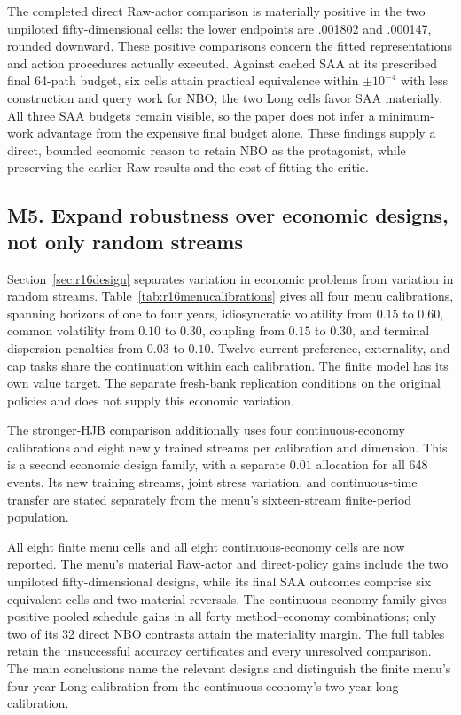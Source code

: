 The completed direct Raw-actor comparison is materially positive in the two unpiloted fifty-dimensional cells: the lower endpoints are .001802 and .000147, rounded downward. These positive comparisons concern the fitted representations and action procedures actually executed. Against cached SAA at its prescribed final 64-path budget, six cells attain practical equivalence within $\pm10^{-4}$ with less construction and query work for NBO; the two Long cells favor SAA materially. All three SAA budgets remain visible, so the paper does not infer a minimum-work advantage from the expensive final budget alone. These findings supply a direct, bounded economic reason to retain NBO as the protagonist, while preserving the earlier Raw results and the cost of fitting the critic.

\subsection*{M5. Expand robustness over economic designs, not only random streams}\label{resp:M5}
Section~\ref{sec:r16design} separates variation in economic problems from variation in random streams. Table~\ref{tab:r16menucalibrations} gives all four menu calibrations, spanning horizons of one to four years, idiosyncratic volatility from $0.15$ to $0.60$, common volatility from $0.10$ to $0.30$, coupling from $0.15$ to $0.30$, and terminal dispersion penalties from $0.03$ to $0.10$. Twelve current preference, externality, and cap tasks share the continuation within each calibration. The finite model has its own value target. The separate fresh-bank replication conditions on the original policies and does not supply this economic variation.

The stronger-HJB comparison additionally uses four continuous-economy calibrations and eight newly trained streams per calibration and dimension. This is a second economic design family, with a separate $0.01$ allocation for all 648 events. Its new training streams, joint stress variation, and continuous-time transfer are stated separately from the menu's sixteen-stream finite-period population.

All eight finite menu cells and all eight continuous-economy cells are now reported. The menu's material Raw-actor and direct-policy gains include the two unpiloted fifty-dimensional designs, while its final SAA outcomes comprise six equivalent cells and two material reversals. The continuous-economy family gives positive pooled schedule gains in all forty method--economy combinations; only two of its 32 direct NBO contrasts attain the materiality margin. The full tables retain the unsuccessful accuracy certificates and every unresolved comparison. The main conclusions name the relevant designs and distinguish the finite menu's four-year Long calibration from the continuous economy's two-year long calibration.

